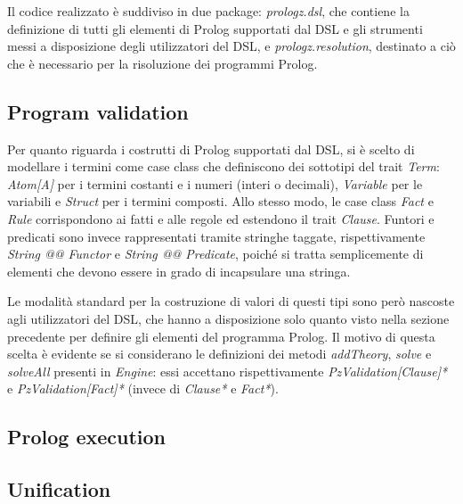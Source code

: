 Il codice realizzato è suddiviso in due package: \textit{prologz.dsl}, che contiene la definizione di tutti gli elementi di Prolog supportati dal DSL e gli strumenti messi a disposizione degli utilizzatori del DSL, e \textit{prologz.resolution}, destinato a ciò che è necessario per la risoluzione dei programmi Prolog.

\subsection{Program validation}

Per quanto riguarda i costrutti di Prolog supportati dal DSL, si è scelto di modellare i termini come case class che definiscono dei sottotipi del trait \textit{Term}: \textit{Atom[A]} per i termini costanti e i numeri (interi o decimali), \textit{Variable} per le variabili e \textit{Struct} per i termini composti. Allo stesso modo, le case class \textit{Fact} e \textit{Rule} corrispondono ai fatti e alle regole ed estendono il trait \textit{Clause}. Funtori e predicati sono invece rappresentati tramite stringhe taggate, rispettivamente \textit{String @@ Functor} e \textit{String @@ Predicate}, poiché si tratta semplicemente di elementi che devono essere in grado di incapsulare una stringa.

Le modalità standard per la costruzione di valori di questi tipi sono però nascoste agli utilizzatori del DSL, che hanno a disposizione solo quanto visto nella sezione precedente per definire gli elementi del programma Prolog. Il motivo di questa scelta è evidente se si considerano le definizioni dei metodi \textit{addTheory}, \textit{solve} e \textit{solveAll} presenti in \textit{Engine}: essi accettano rispettivamente \textit{PzValidation[Clause]*} e \textit{PzValidation[Fact]*} (invece di \textit{Clause*} e \textit{Fact*}).

\subsection{Prolog execution}

\subsection{Unification}

